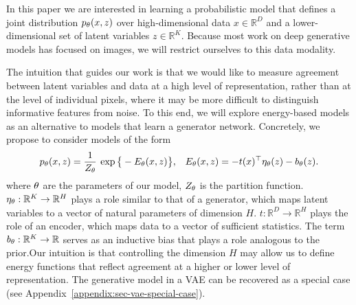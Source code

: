 \documentclass[tablecaption=bottom,wcp]{jmlr} %
\begin{document}
In this paper we are interested in learning a probabilistic model that defines a joint distribution $p_\theta(x, z)$ over high-dimensional data $x \in \mathbb{R}^D$ and a lower-dimensional set of latent variables $z \in \mathbb{R}^K$. Because most work on deep generative models has focused on images, we will restrict ourselves to this data modality. 

The intuition that guides our work is that we would like to measure agreement between latent variables and data at a high level of representation, rather than at the level of individual pixels, where it may be more difficult to distinguish informative features from noise. To this end, we will explore energy-based models as an alternative to models that learn a generator network.
Concretely, we propose to consider models of the form
\begin{align}
    &p_\theta(x, z) = \frac{1}{Z_\theta}\: \exp \big\{ -E_\theta(x,z)\big\}, & E_\theta(x,z) = -t(x)^\top \eta_\theta(z) - b_\theta(z).
\end{align}
where $\theta$ are the parameters of our model, $Z_\theta$ is the partition function. $\eta_\theta: \mathbb{R}^K \to \mathbb{R}^H$ plays a role similar to that of a generator, which maps latent variables to a vector of natural parameters of dimension $H$. $t: \mathbb{R}^D \to \mathbb{R}^H$ plays the role of an encoder, which maps data to a vector of sufficient statistics. The term $b_\theta: \mathbb{R}^K \to \mathbb{R}$ serves as an inductive bias that plays a role analogous to the prior.Our intuition is that controlling the dimension $H$ may allow us to define energy functions that reflect agreement at a higher or lower level of representation. 
The generative model in a VAE can be recovered as a special case (see Appendix~\ref{appendix:sec-vae-special-case}). 
\end{document}
